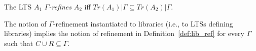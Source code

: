 
\vspace{-1.5mm}
\begin{definition}\label{def:gref}
The LTS $A_1$ \emph{$\Gamma$-refines} $A_2$ if{f} $Tr(A_1) | \Gamma \subseteq Tr(A_2) | \Gamma$.
\vspace{-1.5mm}
\end{definition}

The notion of $\Gamma$-refinement instantiated to libraries (i.e., to LTSs defining libraries) implies the notion of refinement in Definition~\ref{def:lib_ref} for every $\Gamma$ such that $C\cup R \subseteq \Gamma$.
%

